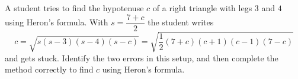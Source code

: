 A student tries to find the hypotenuse $c$ of a right triangle with legs $3$ and $4$ using Heron's formula. With $s=\dfrac{7+c}{2}$ the student writes
\[
c=\sqrt{s(s-3)(s-4)(s-c)}=\sqrt{\dfrac{1}{2}(7+c)(c+1)(c-1)(7-c)}
\]
and gets stuck. Identify the two errors in this setup, and then complete the method correctly to find $c$ using Heron's formula.
